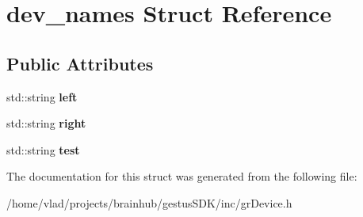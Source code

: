 \hypertarget{structdev__names}{}\section{dev\+\_\+names Struct Reference}
\label{structdev__names}
\subsection*{Public Attributes}
\begin{DoxyCompactItemize}
\item 
\mbox{\label{structdev__names_a7030548518cf451ccb9dc115e944101c}} 
std\+::string {\bfseries left}
\item 
\mbox{\label{structdev__names_a9ae36fcd43bf07d10041b6d4d1c874b7}} 
std\+::string {\bfseries right}
\item 
\mbox{\label{structdev__names_ad0c0d1c45c95408489fa9981b77191ea}} 
std\+::string {\bfseries test}
\end{DoxyCompactItemize}


The documentation for this struct was generated from the following file\+:\begin{DoxyCompactItemize}
\item 
/home/vlad/projects/brainhub/gestus\+S\+D\+K/inc/gr\+Device.\+h\end{DoxyCompactItemize}
